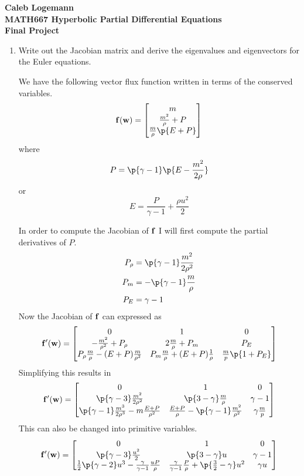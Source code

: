 \documentclass[11pt, oneside]{article}
\begin{document}
\noindent \textbf{\Large{Caleb Logemann \\
MATH667 Hyperbolic Partial Differential Equations \\
Final Project
}}

%
\begin{enumerate}
  \item %
    Write out the Jacobian matrix and derive the eigenvalues and eigenvectors
    for the Euler equations.

    We have the following vector flux function written in terms of the conserved variables.
    \[
      \v{f}(\v{w}) =
      \begin{bmatrix}
        m \\
        \frac{m^2}{\rho} + P \\
        \frac{m}{\rho}\p{E + P}
      \end{bmatrix}
    \]
    where
    \[
      P = \p{\gamma - 1}\p{E - \frac{m^2}{2\rho}}
    \]
    or
    \[
      E = \frac{P}{\gamma - 1} + \frac{\rho u^2}{2}
    \]

    In order to compute the Jacobian of $\mathbf{f}$ I will first compute the partial derivatives of $P$.
    \begin{align*}
      P_{\rho} &= \p{\gamma - 1} \frac{m^2}{2 \rho^2} \\
      P_m &= -\p{\gamma - 1}\frac{m}{\rho} \\
      P_E &= \gamma - 1
    \end{align*}
    Now the Jacobian of $\mathbf{f}$ can expressed as
    \[
      \v{f}'(\v{w}) =
      \begin{bmatrix}
        0 & 1 & 0 \\
        -\frac{m^2}{\rho^2} + P_{\rho} & 2 \frac{m}{\rho} + P_m & P_E \\
        P_{\rho} \frac{m}{\rho} - (E + P)\frac{m}{\rho^2} & P_m \frac{m}{\rho} + (E + P) \frac{1}{\rho} & \frac{m}{p}\p{1 + P_E}
      \end{bmatrix}
    \]
    Simplifying this results in
    \[
      \v{f}'(\v{w}) =
      \begin{bmatrix}
        0 & 1 & 0 \\
        \p{\gamma - 3} \frac{m^2}{2 \rho^2} & \p{3 - \gamma}\frac{m}{\rho} & \gamma - 1 \\
        \p{\gamma - 1} \frac{m^3}{2 \rho^3} - m\frac{E + P}{\rho^2} & \frac{E + P}{\rho} - \p{\gamma - 1}\frac{m^2}{\rho^2}  & \gamma\frac{m}{p}
      \end{bmatrix}
    \]
    This can also be changed into primitive variables.
    \[
      \v{f}'(\v{w}) =
      \begin{bmatrix}
        0 & 1 & 0 \\
        \p{\gamma - 3} \frac{u^2}{2} & \p{3 - \gamma}u & \gamma - 1 \\
        \frac{1}{2}\p{\gamma - 2} u^3 - \frac{\gamma}{\gamma - 1}\frac{uP}{\rho} & \frac{\gamma}{\gamma - 1}\frac{P}{\rho} + \p{\frac{3}{2} - \gamma}u^2  & \gamma u
      \end{bmatrix}
    \]


\end{enumerate}
\end{document}
